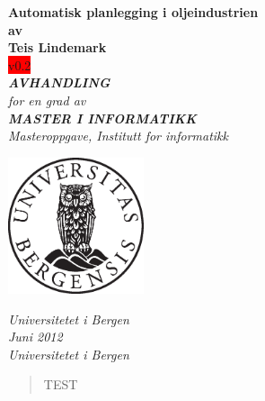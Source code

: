 \documentclass[12pt,twoside,norsk,onecolumn]{article}
\begin{document}
\newcommand{\versjon}{v0.2}

\thispagestyle{empty}
\begin{center}        %
  \vspace{5mm}          %
  \LARGE
  \textbf{Automatisk planlegging i oljeindustrien} \\
  \Large
  \vspace{5mm}
  \textbf{av} \\
  \vspace{5mm}
  \large
  \textbf{Teis Lindemark} \\
  \colorbox{red}{\versjon} \\
  \vspace{30mm}
  \Large
  {\bf{\textsl{AVHANDLING}}} \\
  \textsl{for en grad av} \\
  \vspace{2mm}
  {\bf{\textsl{MASTER I INFORMATIKK}}} \\
  \vspace{5mm}
  {\large \textsl {Masteroppgave, Institutt for informatikk}}\\
  \vspace{10mm}
  \centerline{\includegraphics[width=4cm,height=4cm]{uibugle}}
  \vspace{5mm}
  \textsl{Universitetet i Bergen} \\
  \vspace{10mm}
  \large
  \textsl{Juni 2012} \\
  \vspace{5mm}
  \normalsize
  \textsl{Universitetet i Bergen} \\
\end{center}
\newpage
\vspace*{\fill}
\begin{abstract}
TEST
\end{abstract}
\vspace*{\fill}
\newpage
\end{document}
